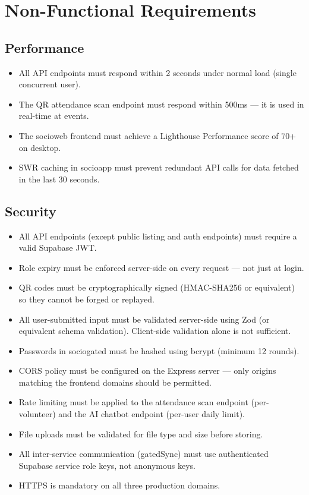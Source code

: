\documentclass[12pt,a4paper]{article}
\begin{document}
\newpage
\section{Non-Functional Requirements}

\subsection{Performance}

\begin{itemize}[leftmargin=*]
    \item All API endpoints must respond within 2 seconds under normal load (single concurrent user).
    \item The QR attendance scan endpoint must respond within 500ms — it is used in real-time at events.
    \item The socioweb frontend must achieve a Lighthouse Performance score of 70+ on desktop.
    \item SWR caching in socioapp must prevent redundant API calls for data fetched in the last 30 seconds.
\end{itemize}

\subsection{Security}

\begin{itemize}[leftmargin=*]
    \item All API endpoints (except public listing and auth endpoints) must require a valid Supabase JWT.
    \item Role expiry must be enforced server-side on every request — not just at login.
    \item QR codes must be cryptographically signed (HMAC-SHA256 or equivalent) so they cannot be forged or replayed.
    \item All user-submitted input must be validated server-side using Zod (or equivalent schema validation). Client-side validation alone is not sufficient.
    \item Passwords in sociogated must be hashed using bcrypt (minimum 12 rounds).
    \item CORS policy must be configured on the Express server — only origins matching the frontend domains should be permitted.
    \item Rate limiting must be applied to the attendance scan endpoint (per-volunteer) and the AI chatbot endpoint (per-user daily limit).
    \item File uploads must be validated for file type and size before storing.
    \item All inter-service communication (gatedSync) must use authenticated Supabase service role keys, not anonymous keys.
    \item HTTPS is mandatory on all three production domains.
\end{itemize}
\end{document}
